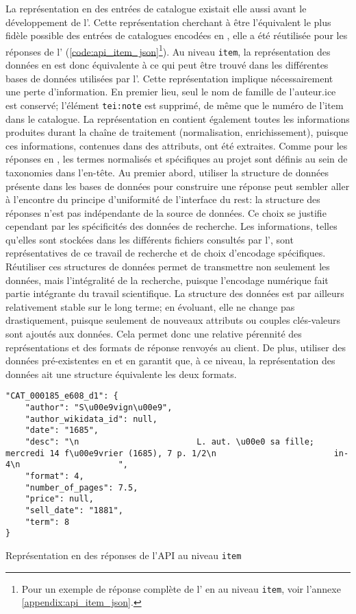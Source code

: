 La représentation en \json{} des entrées de catalogue existait elle aussi avant le développement de l'\api{}. Cette représentation cherchant à être l'équivalent le plus fidèle possible des entrées de catalogues encodées en \tei{}, elle a été réutilisée pour les réponses de l'\api{} (\ref{code:api_item_json}\footnote{
	Pour un exemple de réponse complète de l'\api{} en \xmltei{} au niveau \texttt{item}, voir l'annexe \ref{appendix:api_item_json}.
}). Au niveau \texttt{item}, la représentation des données en \json{} est donc équivalente à ce qui peut être trouvé dans les différentes bases de données utilisées par l'\api{}. Cette représentation implique nécessairement une perte d'information. En premier lieu, seul le nom de famille de l'auteur.ice est conservé; l'élément \texttt{tei:note} est supprimé, de même que le numéro de l'item dans le catalogue. La représentation en \json{} contient également toutes les informations produites durant la chaîne de traitement (normalisation, enrichissement), puisque ces informations, contenues dans des attributs, ont été extraites. Comme pour les réponses en \tei{}, les termes normalisés et spécifiques au projet sont définis au sein de taxonomies dans l'en-tête. Au premier abord, utiliser la structure de données présente dans les bases de données pour construire une réponse peut sembler aller à l'encontre du principe d'uniformité de l'interface du \gls{rest}: la structure des réponses n'est pas indépendante de la source de données. Ce choix se justifie cependant par les spécificités des données de recherche. Les informations, telles qu'elles sont stockées dans les différents fichiers consultés par l'\api{}, sont représentatives de ce travail de recherche et de choix d'encodage spécifiques. Réutiliser ces structures de données permet de transmettre non seulement les données, mais l'intégralité de la recherche, puisque l'encodage numérique fait partie intégrante du travail scientifique. La structure des données est par ailleurs relativement stable sur le long terme; en évoluant, elle ne change pas drastiquement, puisque seulement de nouveaux attributs ou couples clés-valeurs sont ajoutés aux données. Cela permet donc une relative pérennité des représentations et des formats de réponse renvoyés au client. De plus, utiliser des données pré-existentes en \json{} et en \tei{} garantit que, à ce niveau, la représentation des données ait une structure équivalente les deux formats.

\begin{listing}[h]
	\begin{verbatim}
"CAT_000185_e608_d1": {
	"author": "S\u00e9vign\u00e9",
	"author_wikidata_id": null,
	"date": "1685",
	"desc": "\n                        L. aut. \u00e0 sa fille; mercredi 14 f\u00e9vrier (1685), 7 p. 1/2\n                        in-4\n                    ",
	"format": 4,
	"number_of_pages": 7.5,
	"price": null,
	"sell_date": "1881",
	"term": 8
}

	\end{verbatim}
	\caption{Représentation en \json{} des réponses de l'API au niveau \texttt{item}}
	\label{code:api_item_json}
\end{listing}

